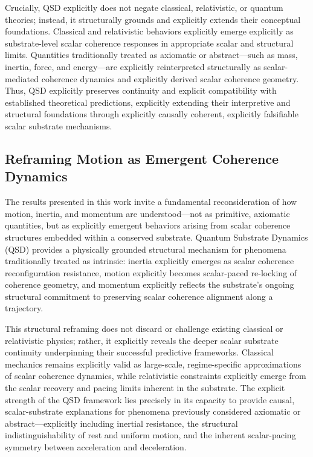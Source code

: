 \documentclass[preprints,article,submit,pdftex,moreauthors]{Definitions/mdpi}
\begin{document}
Crucially, QSD explicitly does not negate classical, relativistic, or quantum theories; instead, it structurally grounds and explicitly extends their conceptual foundations. Classical and relativistic behaviors explicitly emerge explicitly as substrate-level scalar coherence responses in appropriate scalar and structural limits. Quantities traditionally treated as axiomatic or abstract—such as mass, inertia, force, and energy—are explicitly reinterpreted structurally as scalar-mediated coherence dynamics and explicitly derived scalar coherence geometry. Thus, QSD explicitly preserves continuity and explicit compatibility with established theoretical predictions, explicitly extending their interpretive and structural foundations through explicitly causally coherent, explicitly falsifiable scalar substrate mechanisms.



\subsection{Reframing Motion as Emergent Coherence Dynamics}

The results presented in this work invite a fundamental reconsideration of how motion, inertia, and momentum are understood—not as primitive, axiomatic quantities, but as explicitly emergent behaviors arising from scalar coherence structures embedded within a conserved substrate. Quantum Substrate Dynamics (QSD) provides a physically grounded structural mechanism for phenomena traditionally treated as intrinsic: inertia explicitly emerges as scalar coherence reconfiguration resistance, motion explicitly becomes scalar-paced re-locking of coherence geometry, and momentum explicitly reflects the substrate's ongoing structural commitment to preserving scalar coherence alignment along a trajectory.

This structural reframing does not discard or challenge existing classical or relativistic physics; rather, it explicitly reveals the deeper scalar substrate continuity underpinning their successful predictive frameworks. Classical mechanics remains explicitly valid as large-scale, regime-specific approximations of scalar coherence dynamics, while relativistic constraints explicitly emerge from the scalar recovery and pacing limits inherent in the substrate. The explicit strength of the QSD framework lies precisely in its capacity to provide causal, scalar-substrate explanations for phenomena previously considered axiomatic or abstract—explicitly including inertial resistance, the structural indistinguishability of rest and uniform motion, and the inherent scalar-pacing symmetry between acceleration and deceleration.
\end{document}
